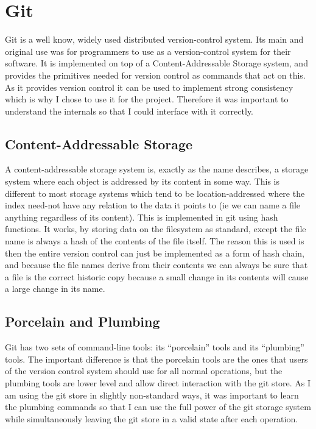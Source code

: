 \section{Git}

Git is a well know, widely used distributed version-control system. Its main and original use was for programmers to use as a version-control system for their software. It is implemented on top of a Content-Addressable Storage system, and provides the primitives needed for version control as commands that act on this. As it provides version control it can be used to implement strong consistency which is why I chose to use it for the project. Therefore it was important to understand the internals so that I could interface with it correctly.

\subsection{Content-Addressable Storage}

A content-addressable storage system is, exactly as the name describes, a storage system where each object is addressed by its content in some way. This is different to most storage systems which tend to be location-addressed where the index need-not have any relation to the data it points to (ie we can name a file anything regardless of its content). This is implemented in git using hash functions. It works, by storing data on the filesystem as standard, except the file name is always a hash of the contents of the file itself. The reason this is used is then the entire version control can just be implemented as a form of hash chain, and because the file names derive from their contents we can always be sure that a file is the correct historic copy because a small change in its contents will cause a large change in its name. 

\subsection{Porcelain and Plumbing}

Git has two sets of command-line tools: its ``porcelain'' tools and its ``plumbing'' tools. The important difference is that the porcelain tools are the ones that users of the version control system should use for all normal operations, but the plumbing tools are lower level and allow direct interaction with the git store. As I am using the git store in slightly non-standard ways, it was important to learn the plumbing commands so that I can use the full power of the git storage system while simultaneously leaving the git store in a valid state after each operation.

